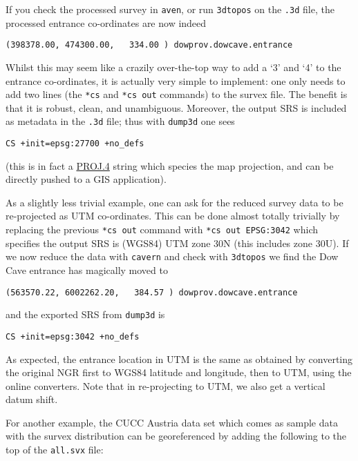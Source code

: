 \documentclass[]{article}
\begin{document}
If you check the processed survey in \verb}aven}, or run
\verb}3dtopos} on the \verb}.3d} file, the processed entrance
co-ordinates are now indeed

\begin{verbatim}
(398378.00, 474300.00,   334.00 ) dowprov.dowcave.entrance
\end{verbatim}

Whilst this may seem like a crazily over-the-top way to add a `3' and
`4' to the entrance co-ordinates, it is actually very simple to
implement: one only needs to add two lines (the \verb}*cs} and
\verb}*cs out} commands) to the survex file. The benefit is that it
is robust, clean, and unambiguous. Moreover, the output SRS is included
as metadata in the \verb}.3d} file; thus with \verb}dump3d} one sees

\begin{verbatim}
CS +init=epsg:27700 +no_defs
\end{verbatim}

(this is in fact a \href{http://proj4.org/}{PROJ.4} string which species
the map projection, and can be directly pushed to a GIS application).

As a slightly less trivial example, one can ask for the reduced survey
data to be re-projected as UTM co-ordinates. This can be done almost
totally trivially by replacing the previous \verb}*cs out} command
with \verb}*cs out EPSG:3042} which specifies the output SRS is
(WGS84) UTM zone 30N (this includes zone 30U). If we now reduce the data
with \verb}cavern} and check with \verb}3dtopos} we find the Dow
Cave entrance has magically moved to

\begin{verbatim}
(563570.22, 6002262.20,   384.57 ) dowprov.dowcave.entrance
\end{verbatim}

and the exported SRS from \verb}dump3d} is

\begin{verbatim}
CS +init=epsg:3042 +no_defs
\end{verbatim}

As expected, the entrance location in UTM is the same as obtained by
converting the original NGR first to WGS84 latitude and longitude, then
to UTM, using the online converters. Note that in re-projecting to UTM,
we also get a vertical datum shift.

For another example, the CUCC Austria data set which comes as sample
data with the survex distribution can be georeferenced by adding the
following to the top of the \verb}all.svx} file:
\end{document}

